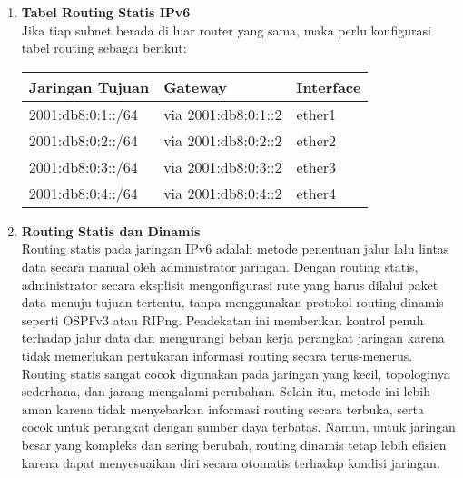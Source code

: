 \begin{enumerate}
    \item \textbf{Tabel Routing Statis IPv6}\\
    Jika tiap subnet berada di luar router yang sama, maka perlu konfigurasi tabel routing sebagai berikut:

    \begin{center}
        \begin{tabular}{|l|l|l|}
        \hline
        \textbf{Jaringan Tujuan} & \textbf{Gateway} & \textbf{Interface} \\
        \hline
        2001:db8:0:1::/64 & via 2001:db8:0:1::2 & ether1 \\
        2001:db8:0:2::/64 & via 2001:db8:0:2::2 & ether2 \\
        2001:db8:0:3::/64 & via 2001:db8:0:3::2 & ether3 \\
        2001:db8:0:4::/64 & via 2001:db8:0:4::2 & ether4 \\
        \hline
        \end{tabular}
    \end{center}

    \item \textbf{Routing Statis dan Dinamis}\\
    Routing statis pada jaringan IPv6 adalah metode penentuan jalur lalu lintas data secara manual oleh administrator jaringan. Dengan routing statis, administrator secara eksplisit mengonfigurasi rute yang harus dilalui paket data menuju tujuan tertentu, tanpa menggunakan protokol routing dinamis seperti OSPFv3 atau RIPng. Pendekatan ini memberikan kontrol penuh terhadap jalur data dan mengurangi beban kerja perangkat jaringan karena tidak memerlukan pertukaran informasi routing secara terus-menerus. Routing statis sangat cocok digunakan pada jaringan yang kecil, topologinya sederhana, dan jarang mengalami perubahan. Selain itu, metode ini lebih aman karena tidak menyebarkan informasi routing secara terbuka, serta cocok untuk perangkat dengan sumber daya terbatas. Namun, untuk jaringan besar yang kompleks dan sering berubah, routing dinamis tetap lebih efisien karena dapat menyesuaikan diri secara otomatis terhadap kondisi jaringan.
\end{enumerate}